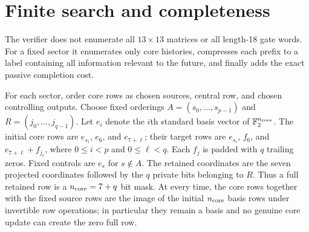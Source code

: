 \documentclass[11pt]{article}
\newcommand{\F}{\mathbb F_2}
\begin{document}
\section{Finite search and completeness}
The verifier does not enumerate all $13\times13$ matrices or all length-18
gate words. For a fixed sector it enumerates only core histories, compresses
each prefix to a label containing all information relevant to the future,
and finally adds the exact passive completion cost.

For each sector, order core rows as chosen sources, central row, and
chosen controlling outputs. Choose fixed orderings
$A=(s_0,\ldots,s_{p-1})$ and $R=(j_0,\ldots,j_{q-1})$. Let $e_i$ denote the
$i$th standard basis vector of $\F^{n_{\rm core}}$. The initial core rows are
$e_{s_i}$, $e_6$, and $e_{7+\ell}$; their target rows are
$e_{s_i}$, $f_6$, and $e_{7+\ell}+f_{j_\ell}$, where
$0\le i<p$ and $0\le\ell<q$. Each $f_j$ is padded with $q$ trailing zeros.
Fixed controls are $e_s$ for $s\notin A$.
The retained coordinates are the seven projected coordinates followed by
the $q$ private bits belonging to $R$. Thus a full retained row is a
$n_{\rm core}=7+q$ bit mask. At every time, the core rows together with the
fixed source rows are the image of the initial $n_{\rm core}$ basis rows
under invertible row
operations; in particular they remain a basis and no genuine core update
can create the zero full row.
\end{document}
